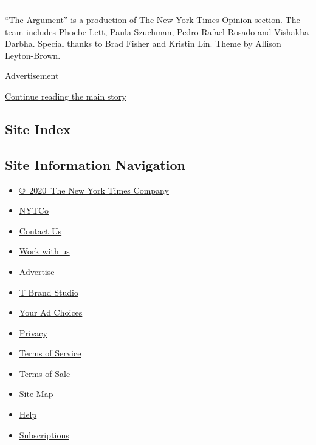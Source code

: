 \begin{center}\rule{0.5\linewidth}{\linethickness}\end{center}

``The Argument'' is a production of The New York Times Opinion section.
The team includes Phoebe Lett, Paula Szuchman, Pedro Rafael Rosado and
Vishakha Darbha. Special thanks to Brad Fisher and Kristin Lin. Theme by
Allison Leyton-Brown.

Advertisement

\protect\hyperlink{after-bottom}{Continue reading the main story}

\hypertarget{site-index}{%
\subsection{Site Index}\label{site-index}}

\hypertarget{site-information-navigation}{%
\subsection{Site Information
Navigation}\label{site-information-navigation}}

\begin{itemize}
\tightlist
\item
  \href{https://help.nytimes3xbfgragh.onion/hc/en-us/articles/115014792127-Copyright-notice}{©~2020~The
  New York Times Company}
\end{itemize}

\begin{itemize}
\tightlist
\item
  \href{https://www.nytco.com/}{NYTCo}
\item
  \href{https://help.nytimes3xbfgragh.onion/hc/en-us/articles/115015385887-Contact-Us}{Contact
  Us}
\item
  \href{https://www.nytco.com/careers/}{Work with us}
\item
  \href{https://nytmediakit.com/}{Advertise}
\item
  \href{http://www.tbrandstudio.com/}{T Brand Studio}
\item
  \href{https://www.nytimes3xbfgragh.onion/privacy/cookie-policy\#how-do-i-manage-trackers}{Your
  Ad Choices}
\item
  \href{https://www.nytimes3xbfgragh.onion/privacy}{Privacy}
\item
  \href{https://help.nytimes3xbfgragh.onion/hc/en-us/articles/115014893428-Terms-of-service}{Terms
  of Service}
\item
  \href{https://help.nytimes3xbfgragh.onion/hc/en-us/articles/115014893968-Terms-of-sale}{Terms
  of Sale}
\item
  \href{https://spiderbites.nytimes3xbfgragh.onion}{Site Map}
\item
  \href{https://help.nytimes3xbfgragh.onion/hc/en-us}{Help}
\item
  \href{https://www.nytimes3xbfgragh.onion/subscription?campaignId=37WXW}{Subscriptions}
\end{itemize}
